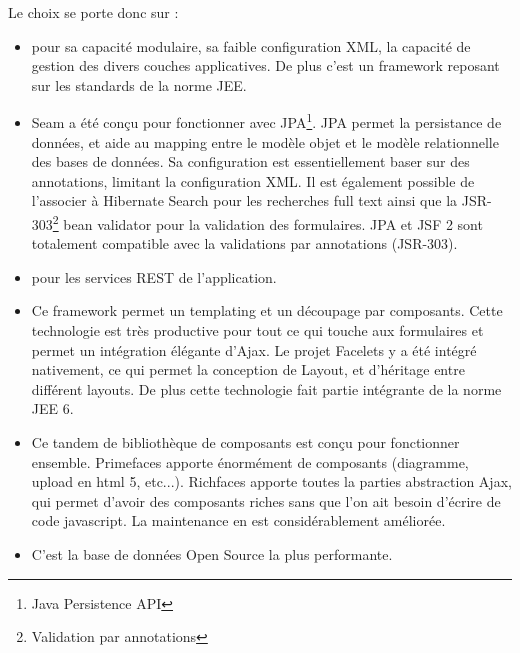 \newpage{}
Le choix se porte donc sur :
\begin{itemize}
	\item {}
		pour sa capacité modulaire, sa faible configuration XML, la capacité de gestion des divers 
		couches applicatives. De plus c'est un framework reposant sur les standards de la norme JEE.
		\\
		
	\item {}	
		Seam a été conçu pour fonctionner avec JPA\footnote{Java Persistence API}. JPA permet la persistance de données, et aide
		au mapping entre le modèle objet et le modèle relationnelle des bases de données. Sa configuration
		est essentiellement baser sur des annotations, limitant la configuration XML. Il est également
		possible de l'associer à Hibernate Search pour les recherches full text ainsi que la
		JSR-303\footnote{Validation par annotations} bean
		validator pour la validation des formulaires. JPA et JSF 2 sont totalement compatible avec 
		la validations par annotations (JSR-303).
		\\
		
	\item {} pour les services REST de l'application.
		\\
		
	\item {}
		Ce framework  permet un templating et un découpage par composants. Cette technologie est très 
		productive pour tout ce qui touche aux formulaires et permet un intégration élégante
		d'Ajax. Le projet Facelets y a été intégré nativement, ce qui permet la conception 
		de Layout, et d'héritage entre différent layouts. De plus cette technologie fait
		partie intégrante de la norme JEE 6.
		\\
			    			
	\item {}
		Ce tandem de bibliothèque de composants est conçu pour fonctionner ensemble. Primefaces
		apporte énormément de composants (diagramme, upload en html 5, etc...). Richfaces apporte
		toutes la parties abstraction Ajax, qui permet d'avoir des composants riches sans que l'on ait 
		besoin d'écrire de code javascript. La maintenance en est considérablement améliorée. 
		\\
				
	\item {}	 C'est la base de données Open Source la plus performante.
		\\
			

\end{itemize}
